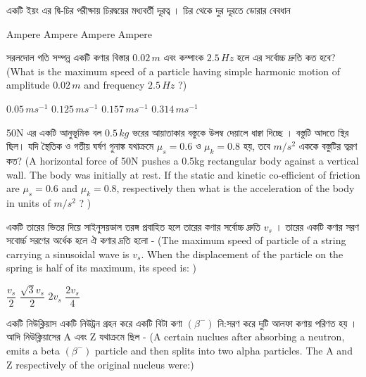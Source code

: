 \documentclass[addpoints]{exam}
\begin{document}
\begin{questions}
\begin{oneparchoices}
\end{oneparchoices}

\question  একটি ইয়ং এর দ্বি-চির পরীক্ষায় চিরদ্বয়ের মধ্যবর্তী দূরত্ব । চির থেকে দুর দূরতে ডোরার বেবধান 

\begin{oneparchoices}
 Ampere
 Ampere
 Ampere
 Ampere
\end{oneparchoices}


\question  সরলদোল গতি সম্পন্ন একটি কণার বিস্তার $ 0.02\,m $ এবং কম্পাংক $ 2.5\,Hz $ হলে এর সর্বোচ্চ দ্রুতি কত হবে? (What is the maximum speed of a particle having simple harmonic motion of amplitude $ 0.02\,m $ and frequency $ 2.5\,Hz $ ?)

\begin{oneparchoices}
\choice $ 0.05\,ms^{-1} $
\choice $ 0.125\,ms^{-1} $
\choice $ 0.157\,ms^{-1} $
\choice $ 0.314\,ms^{-1} $
\end{oneparchoices}

\question 50N এর একটি আনুভূমিক বল $ 0.5\,kg $ ভরের আয়াতাকার বস্তুকে উলম্ব দেয়ালে ধাক্বা দিচ্ছে । বস্তুটি আদতে স্থির ছিল। যদি স্থৈতিক ও গতীয় ঘর্ষণ গুনাঙ্ক যথাক্রমে $ \mu_{s} = 0.6 $ ও  $ \mu_{k} = 0.8 $ হয়, তবে $ m/s^{2} $ এককে বস্তুটির ত্বরণ কত? (A horizontal force of 50N pushes a 0.5kg rectangular body against a vertical wall. The body was initially at rest. If the static and kinetic co-efficient of friction are $ \mu_{s} = 0.6 $ and $ \mu_{k} = 0.8 $, respectively then what is the acceleration of the body in units of $ m/s^{2} $ ? )

\begin{oneparchoices}
\end{oneparchoices}

\question  একটি তারের ভিতর দিয়ে সাইনুসয়ডাল তরঙ্গ প্রবাহিত হলে তারের কণার সর্বোচ্চ দ্রুতি $ v_{s} $ । তারের একটি কণার সরণ সবোর্চ্চ সরণের অর্ধেক হলে ঐ কণার দ্রতি হলো - (The maximum speed of particle of a string carrying a sinusoidal wave is $ v_{s} $. When the displacement of the particle on the spring is half of its maximum, its speed is: )

\begin{oneparchoices}
\choice $ \dfrac{v_{s}}{2} $
\choice $ \dfrac{\sqrt{3}v_{s}}{2} $
\choice $ 2v_{s} $
\choice $ \dfrac{2v_{s}}{4} $
\end{oneparchoices}

\question  একটি নিউক্লিয়াস একটি নিউট্রন গ্রহন করে একটি বিটা কণা $ (\beta^{-})  $ নি:সরণ করে  দুটি আলফা কণায় পরিণত হয় । আদি নিউক্লিয়াসের A এবং Z যথাক্রমে ছিল - (A certain nuclues after absorbing a neutron, emits a beta $ (\beta^{-})  $ particle and then splits into two alpha particles. The A and Z respectively of the original nucleus were:)


\end{questions}
\end{document}
